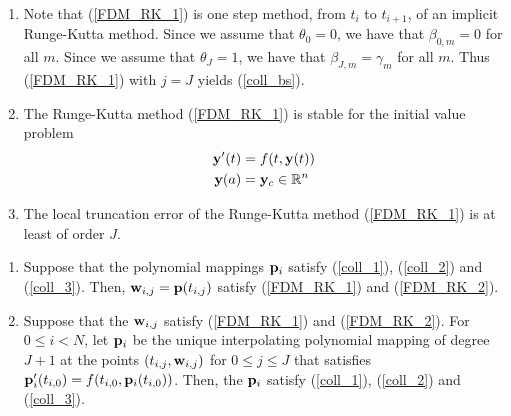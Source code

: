 \begin{rmkList}
\begin{enumerate}
\item Note that (\ref{FDM_RK_1}) is one step method, from $t_i$ to
$t_{i+1}$, of an implicit Runge-Kutta method.  Since we assume that
$\theta_0=0$, we have that $\beta_{0,m}=0$ for all $m$.
Since we assume that $\theta_J=1$, we have that
$\beta_{J,m} = \gamma_m$ for all $m$.  Thus (\ref{FDM_RK_1}) with
$j=J$ yields (\ref{coll_bs}).
\item The Runge-Kutta method (\ref{FDM_RK_1}) is stable for the
initial value problem
\begin{align*}
\mathbf{y}'(t) &= f(t,\mathbf{y}(t)) \\
\mathbf{y}(a) &= \mathbf{y}_c \in \mathbb{R}^n
\end{align*}
\item The local truncation error of the Runge-Kutta method
(\ref{FDM_RK_1}) is at least of order $J$.
\end{enumerate}
\end{rmkList}

\begin{theorem}
\begin{enumerate}
\item Suppose that the polynomial mappings $\mathbf{p}_i$ satisfy
(\ref{coll_1}), (\ref{coll_2}) and (\ref{coll_3}).  Then,
$\mathbf{w}_{i,j} = \mathbf{p}(t_{i,j})$ satisfy (\ref{FDM_RK_1})
and (\ref{FDM_RK_2}).
\item Suppose that the $\mathbf{w}_{i,j}$ satisfy (\ref{FDM_RK_1}) and
(\ref{FDM_RK_2}).  For $0\leq i < N$, let $\mathbf{p}_i$ be
the unique interpolating polynomial mapping of degree $J+1$ at the
points $(t_{i,j},\mathbf{w}_{i,j})$ for $0\leq j \leq J$ that satisfies
$\mathbf{p}_i'(t_{i,0}) = f(t_{i,0},\mathbf{p}_i(t_{i,0}))$.  Then,
the $\mathbf{p}_i$ satisfy (\ref{coll_1}), (\ref{coll_2}) and
(\ref{coll_3}).
\end{enumerate}
\end{theorem}

